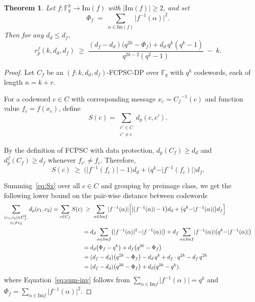 \documentclass[11pt,draftclsnofoot,journal,onecolumn]{IEEEtran}
\newtheorem{theorem}{Theorem}
\newcommand{\Img}{\mathrm{Im}}
\begin{document}
    \begin{theorem}
    \label{thm:plotkin}
    Let $f : \mathbb{F}_q^{k} \to \mathrm{Im}(f)$ with $|\mathrm{Im}(f)| \ge 2$, and set
    \[
    \Phi_f \;=\; \sum_{\alpha \in \mathrm{Im}(f)} \bigl|f^{-1}(\alpha)\bigr|^{2}.
    \]
    Then for any $d_d \le d_f$,
    \[
    r_p^f(k,d_d,d_f) \;\ge\;
    \frac{(d_f-d_d)\bigl(q^{2k}-\Phi_f\bigr) + d_d\,q^{k}(q^{k}-1)}
         {q^{2k-2}(q^{2}-1)} \;-\; k .
    \]
\end{theorem}
 
    \begin{proof}
    Let ${C_f}$ be an $(f: k,d_d,d_f)$-FCPSC-DP over $\mathbb{F}_q$ with $q^k$ codewords, each of length $n = k + r$.
    
    For a codeword $c\in C$ with corresponding message $x_c = {C_f}^{-1}(c)$ and function value $f_c = f(x_c)$, define
    \[
         S(c) = \sum_{\substack{c'\in C\\c'\neq c}} d_p(c,c').
    \]
    
    By the definition of FCPSC with data protection, $d_p(C_f)\geq d_d$  and  $d_p^f(C_f)\geq d_f$ whenever $f_{c'} \neq f_c$.  Therefore,
    \begin{equation}\label{eq:Sx}
     S(c)
    \;\geq \;
     \bigl(\rvert f^{-1}{(f_c)}\rvert - 1\bigr)d_d
    + \bigl(q^k - \rvert f^{-1}({f_c})\rvert\bigr)d_f.
    \end{equation}

    \noindent
    Summing~\eqref{eq:Sx} over all $c\in C$ and grouping by preimage class, we get the following lower bound on the pair-wise distance between codewords 
    \begin{align}
    \sum_{\substack{(c_1,c_2)\in C_f^2,\\c_1\neq c_2}}d_p(c_1,c_2) = \sum_{c\in C_f} S(c)
    &\;\geq \; \sum_{\alpha\in\Img{f}} \rvert f^{-1}({\alpha})\rvert \Bigl[\bigl\rvert(f^{-1}({\alpha})\rvert-1\bigr)d_d
        + \bigl(q^k - \rvert f^{-1}({\alpha})\rvert\bigr)d_f\Bigr]
    \notag\\
    &= d_d\sum_{\alpha\in\Img{f}}\bigl(\rvert f^{-1}({\alpha})\rvert^2 - \rvert f^{-1}({\alpha})\rvert\bigr)
    + d_f\sum_{\alpha\in\Img{f}}\rvert f^{-1}({\alpha})\rvert\bigl(q^k - \rvert f^{-1}({\alpha})\rvert\bigr)
    \notag\\
    &= d_d\bigl(\Phi_f - q^k\bigr)
    + d_f\bigl(q^{2k} - \Phi_f\bigr)\label{eq:sum-inv}
    \\
    &= (d_f-d_d)\bigl(q^{2k}-\Phi_f\bigr) - d_d\,q^k + d_f\cdot q^{2k} - d_f\,q^{2k}
    \notag\\
    &= (d_f-d_d)\bigl(q^{2k}-\Phi_f\bigr) + d_d(q^{2k}-q^k).
    \label{eq:lower}
    \end{align}
    where Equation~\ref{eq:sum-inv} follows from $\sum_{\alpha\in\Img{f}}\rvert f^{-1}({\alpha})\rvert = q^k$ and $\Phi_f = \sum_{\alpha\in\Img{f}} \rvert f^{-1}({\alpha})\rvert^2$.


\end{proof}
\end{document}
